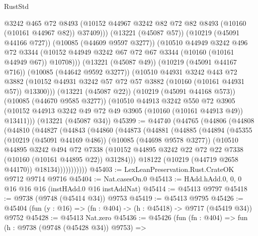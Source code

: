 \begin{lexlean}{RustStd}
\begin{coremodule}
              @3242
              @465
              @72
              @8493
              (@10152 @44967 @3242 @82 @72 @82 @8493 (@10160 (@10161 @44967 @82)) @37409)))
          (@13221 (@45087 @57))
          (@10219 (@45091 @44166 @727))
          (@10085 (@44609 @9597 @3277))
          (@10510
            @44949
            @3242
            @496
            @72
            @3344
            (@10152 @44949 @3242 @67 @72 @67 @3344 (@10160 (@10161 @44949 @67)) @10708)))
        (@13221 (@45087 @49))
        (@10219 (@45091 @44167 @716))
        (@10085 (@44642 @9592 @3277))
        (@10510
          @44931
          @3242
          @443
          @72
          @3882
          (@10152 @44931 @3242 @57 @72 @57 @3882 (@10160 (@10161 @44931 @57)) @13300)))
      (@13221 (@45087 @22))
      (@10219 (@45091 @44168 @573))
      (@10085 (@44670 @9585 @3277))
      (@10510
        @44913
        @3242
        @550
        @72
        @3905
        (@10152 @44913 @3242 @49 @72 @49 @3905 (@10160 (@10161 @44913 @49)) @13411)))
    (@13221 (@45087 @34))
@45399 := @44740
    (@44765
      (@44806
        (@44808
          (@44810
            (@44827
              (@44843
                (@44860
                  (@44873
                    (@44881
                      (@44885
                        (@44894
                          (@45355
                            (@10219 (@45091 @44169 @486))
                            (@10085 (@44698 @9578 @3277))
                            (@10510
                              @44895
                              @3242
                              @494
                              @72
                              @7338
                              (@10152
                                @44895
                                @3242
                                @22
                                @72
                                @22
                                @7338
                                (@10160 (@10161 @44895 @22))
                                @31284)))
                          @18122
                          (@10219 (@44719 @2658 @44170))
                          @18134)))))))))))
@45403 := LexLeanPreservation.Rust.CrateOK @9712 @9714 @9716
@45404 := Nat.casesOn.{0}
@45413 := HAdd.hAdd.{0, 0, 0} @16 @16 @16 (instHAdd.{0} @16 instAddNat)
@45414 := @45413 @9797
@45418 := @9738 (@9748 (@45414 @34)) @9753
@45419 := @45413 @9795
@45426 := @45404 (fun (y : @16) => (fn : @404) -> (h : @45418) -> @9717 (@45419 @34)) @9752
@45428 := @45413 Nat.zero
@45436 := @45426
    (fun (fn : @404) =>
    fun (h : @9738 (@9748 (@45428 @34)) @9753) =>

\end{coremodule}
\end{lexlean}
